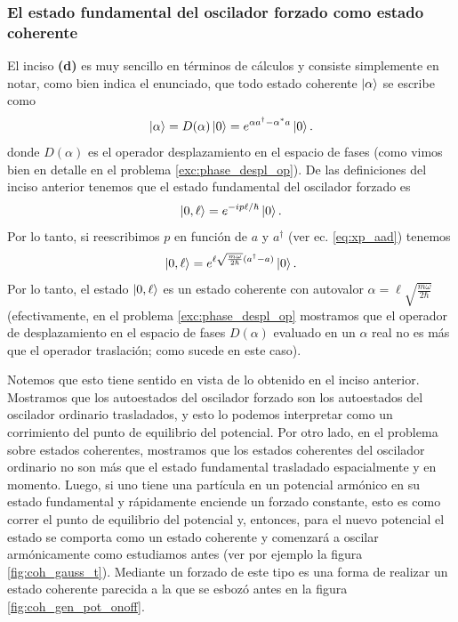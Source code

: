 \documentclass[10pt, a4paper]{article}
\numberwithin{equation}{subsection}
\begin{document}
\subsubsection{El estado fundamental del oscilador forzado como estado
  coherente}
El inciso \textbf{(d)} es muy sencillo en términos de cálculos y consiste
simplemente en notar, como bien indica el enunciado, que todo estado coherente
$\ket{\alpha}$ se escribe como
\begin{equation}
  \ket{\alpha} = D(\alpha)\ket{0} = e^{\alpha a^\dagger - \alpha^* a}\ket{0}.
\end{equation}
donde $D(\alpha)$ es el operador desplazamiento en el espacio de fases (como
vimos bien en detalle en el problema \ref{exc:phase_despl_op}).
De las definiciones del inciso anterior tenemos que el estado fundamental del
oscilador forzado es
\begin{equation}
  \ket{0,\ell} = e^{-ip\ell/\hbar}\ket{0}.
\end{equation}
Por lo tanto, si reescribimos $p$ en función de $a$ y $a^\dagger$ (ver ec.
\eqref{eq:xp_aad}) tenemos
\begin{equation}
  \ket{0,\ell} = e^{\ell\sqrt{\frac{m\omega}{2\hbar}}(a^\dagger - a)}\ket{0}.
\end{equation}
Por lo tanto, el estado $\ket{0, \ell}$ es un estado coherente con autovalor
$\alpha = \ell\sqrt{\frac{m\omega}{2\hbar}}$ (efectivamente, en el problema
\ref{exc:phase_despl_op} mostramos que el operador de desplazamiento en el
espacio de fases $D(\alpha)$ evaluado en un $\alpha$ real no es más que el
operador traslación; como sucede en este caso).

\bigbreak

Notemos que esto tiene sentido en vista de lo obtenido en el inciso anterior.
Mostramos que los autoestados del oscilador forzado son los autoestados del
oscilador ordinario trasladados, y esto lo podemos interpretar como un
corrimiento del punto de equilibrio del potencial. Por otro lado, en el
problema sobre estados coherentes, mostramos que los estados coherentes del
oscilador ordinario no son más que el estado fundamental trasladado
espacialmente y en momento. Luego, si uno tiene una partícula en un potencial
armónico en su estado fundamental y rápidamente enciende un forzado constante,
esto es como correr el punto de equilibrio del potencial y, entonces, para el
nuevo potencial el estado se comporta como un estado coherente y comenzará a
oscilar armónicamente como estudiamos antes (ver por ejemplo la figura
\ref{fig:coh_gauss_t}). Mediante un forzado de este tipo es una forma de
realizar un estado coherente parecida a la que se esbozó antes en la figura
\ref{fig:coh_gen_pot_onoff}.
\end{document}
